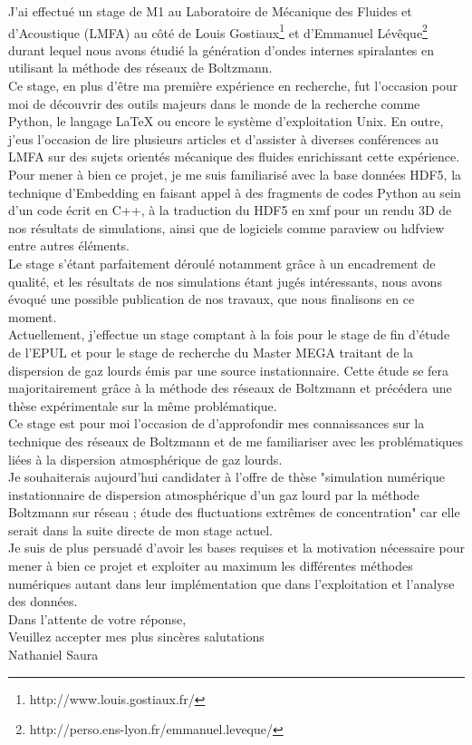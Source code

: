 \documentclass[french, roman, 11pt]{article}
\begin{document}
J'ai effectué un stage de M1 au Laboratoire de Mécanique des Fluides et d'Acoustique (\textsc{LMFA}) au côté de Louis Gostiaux\footnote{http://www.louis.gostiaux.fr/} et d'Emmanuel Lévêque\footnote{http://perso.ens-lyon.fr/emmanuel.leveque/} durant lequel nous avons étudié la génération d'ondes internes spiralantes en utilisant la méthode des réseaux de Boltzmann. \\ 
Ce stage, en plus d'être ma première expérience en recherche, fut l'occasion pour moi de découvrir des outils majeurs dans le monde de la recherche comme Python, le langage \LaTeX $ $ ou encore le système d'exploitation Unix. En outre, j'eus l'occasion de lire plusieurs articles et d'assister à diverses conférences au LMFA sur des sujets orientés mécanique des fluides enrichissant cette expérience. \\ 
Pour mener à bien ce projet, je me suis familiarisé avec la base données \textsc{HDF5}, la technique d'Embedding en faisant appel à des fragments de codes Python au sein d'un code écrit en C++, à la traduction du \textsc{HDF5} en xmf pour un rendu 3D de nos résultats de simulations, ainsi que de logiciels comme paraview ou hdfview entre autres éléments.\\
 Le stage s'étant parfaitement déroulé notamment grâce à un encadrement de qualité, et les résultats de nos simulations étant jugés intéressants, nous avons évoqué une possible publication de nos travaux, que nous finalisons en ce moment. \\
Actuellement, j'effectue un stage comptant à la fois pour le stage de fin d'étude de l'\textsc{EPUL} et pour le stage de recherche du Master \textsc{MEGA} traitant de la dispersion de gaz lourds émis par une source instationnaire. Cette étude se fera majoritairement grâce à la méthode des réseaux de Boltzmann et précédera une thèse expérimentale sur la même problématique. \\
Ce stage est pour moi l'occasion de d'approfondir mes connaissances sur la technique des réseaux de Boltzmann et de me familiariser avec les problématiques liées à la dispersion atmosphérique de gaz lourds.  \\
 
Je souhaiterais aujourd'hui candidater à l'offre de thèse "simulation numérique instationnaire de dispersion atmosphérique
d’un gaz lourd par la méthode Boltzmann sur réseau ; étude des fluctuations extrêmes de concentration" car elle serait dans la suite directe de mon stage actuel.\\
 Je suis de plus persuadé d'avoir les bases requises et la motivation nécessaire pour mener à bien ce projet et exploiter au maximum les différentes méthodes numériques autant dans leur implémentation que dans l'exploitation et l'analyse des données.
\\[2mm] 

\raggedleft \small
Dans l'attente de votre réponse, \\
Veuillez accepter mes plus sincères salutations \\
Nathaniel Saura
\end{document}
